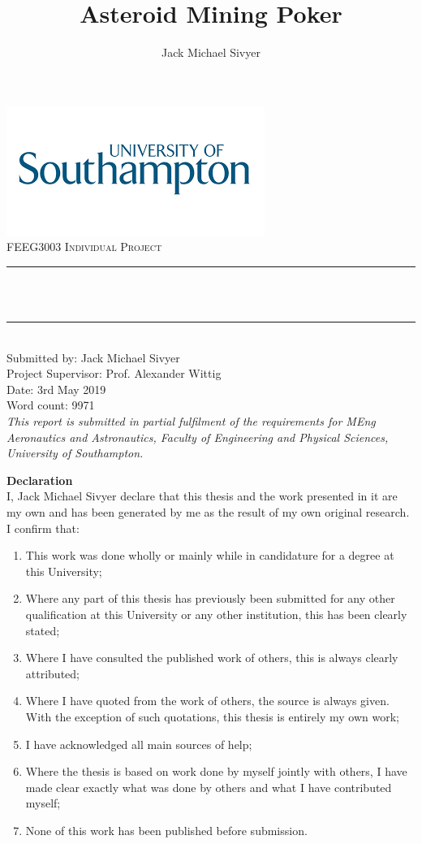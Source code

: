 \documentclass[11pt, twoside]{article}
\title{Asteroid Mining Poker}
\author{Jack Michael Sivyer}
\makeatletter
\def\cleardoublepage{\clearpage\if@twoside \ifodd\c@page\else
	\hbox{}\thispagestyle{empty}\newpage\if@twocolumn\hbox{}\newpage\fi\fi\fi}
\let\thetitle\@title
\makeatother
\begin{document}
\large
{}

\begin{titlepage}
\centering
\includegraphics[scale = 0.7]{southampton_logo.png}\\[3.7 cm]
\textsc{\Large FEEG3003 Individual Project }\\[0.5 cm]
\rule{\linewidth}{0.2 mm} \\[0.4 cm]
{\huge \bfseries \thetitle}\\
\rule{\linewidth}{0.2 mm} \\[1.5 cm]
Submitted by: Jack Michael Sivyer\\
Project Supervisor: Prof. Alexander Wittig\\
Date: 3rd May 2019\\
Word count: 9971
\\[6.5cm]
\textit{This report is submitted in partial fulfilment of the requirements for MEng Aeronautics and Astronautics, Faculty of Engineering and Physical Sciences, University of Southampton.}
\end{titlepage}

\cleardoublepage
\restoregeometry
{}
{}
{\huge\textbf{Declaration}}\\[0.7 cm]
I, Jack Michael Sivyer declare that this thesis and the work presented in it are my own and has been generated by me as the result of my own original research.
I confirm that:\\
\begin{enumerate}
	\item This work was done wholly or mainly while in candidature for a degree at this University;
	\item Where any part of this thesis has previously been submitted for any other qualification at this University or any other institution, this has been clearly stated;
	\item Where I have consulted the published work of others, this is always clearly attributed;
	\item Where I have quoted from the work of others, the source is always given. With the exception of such quotations, this thesis is entirely my own work;
	\item I have acknowledged all main sources of help;
	\item Where the thesis is based on work done by myself jointly with others, I have
	made clear exactly what was done by others and what I have contributed myself;
	\item None of this work has been published before submission.
\end{enumerate}
\end{document}
